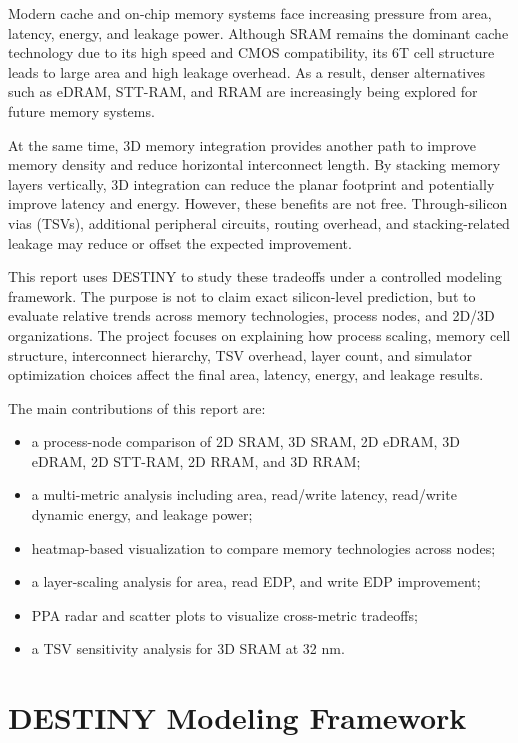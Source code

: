 \documentclass[conference]{IEEEtran}
\begin{document}
Modern cache and on-chip memory systems face increasing pressure from area, latency, energy, and leakage power. Although SRAM remains the dominant cache technology due to its high speed and CMOS compatibility, its 6T cell structure leads to large area and high leakage overhead. As a result, denser alternatives such as eDRAM, STT-RAM, and RRAM are increasingly being explored for future memory systems.

At the same time, 3D memory integration provides another path to improve memory density and reduce horizontal interconnect length. By stacking memory layers vertically, 3D integration can reduce the planar footprint and potentially improve latency and energy. However, these benefits are not free. Through-silicon vias (TSVs), additional peripheral circuits, routing overhead, and stacking-related leakage may reduce or offset the expected improvement.

This report uses DESTINY to study these tradeoffs under a controlled modeling framework. The purpose is not to claim exact silicon-level prediction, but to evaluate relative trends across memory technologies, process nodes, and 2D/3D organizations. The project focuses on explaining how process scaling, memory cell structure, interconnect hierarchy, TSV overhead, layer count, and simulator optimization choices affect the final area, latency, energy, and leakage results.

The main contributions of this report are:
\begin{itemize}
    \item a process-node comparison of 2D SRAM, 3D SRAM, 2D eDRAM, 3D eDRAM, 2D STT-RAM, 2D RRAM, and 3D RRAM;
    \item a multi-metric analysis including area, read/write latency, read/write dynamic energy, and leakage power;
    \item heatmap-based visualization to compare memory technologies across nodes;
    \item a layer-scaling analysis for area, read EDP, and write EDP improvement;
    \item PPA radar and scatter plots to visualize cross-metric tradeoffs;
    \item a TSV sensitivity analysis for 3D SRAM at 32 nm.
\end{itemize}

\section{DESTINY Modeling Framework}
\end{document}
